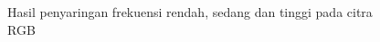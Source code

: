 \begin{figure}
\begin{center}
\caption{Hasil penyaringan frekuensi rendah, sedang dan tinggi pada citra RGB}
\label{fig:filteringFreq}
\end{center}
\end{figure}
